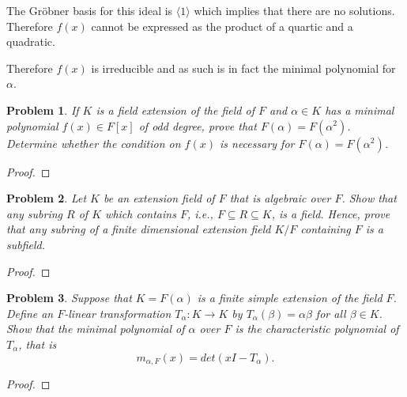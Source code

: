 \documentclass[10pt]{article}
\newcommand{\sk}{\vskip 10mm}
\theoremstyle{plain}
\newtheorem{problem}{Problem}
\theoremstyle{remark}
\begin{document}
The Gr\"obner basis for this ideal is $\langle 1\rangle$ which implies that there are no solutions.
Therefore $f(x)$ cannot be expressed as the product of a quartic and a quadratic.

Therefore $f(x)$ is irreducible and as such is in fact the minimal polynomial for $\alpha$.

\sk

\begin{problem}
  If $K$ is a field extension of the field of $F$ and
  $\alpha \in K$ has a minimal polynomial $f(x) \in F[x]$ of odd degree,
  prove that $F(\alpha) = F(\alpha^2)$. Determine whether the condition
  on $f(x)$ is necessary for $F(\alpha) = F(\alpha^2)$.
\end{problem}

\begin{proof}
  
\end{proof}

\sk

\begin{problem}{6}
  Let $K$ be an extension field of $F$ that is algebraic over $F$.
  Show that any subring $R$ of $K$ which contains $F$, i.e.,
  $F \subseteq R \subseteq K$, is a field. Hence, prove that any subring of
  a finite dimensional extension field $K/F$ containing $F$ is a subfield.
\end{problem}

\begin{proof}
  
\end{proof}

\sk

\begin{problem}{7}
  Suppose that $K = F(\alpha)$ is a finite simple extension of the field $F$.
  Define an $F$-linear transformation
  $T_\alpha: K \to K$ by $T_\alpha (\beta) = \alpha\beta$ for all $\beta \in K$.
  Show that the minimal polynomial of $\alpha$ over $F$ is the characteristic
  polynomial of $T_\alpha$, that is
  \begin{equation*}
    m_{\alpha, F}(x) = det(xI - T_\alpha).
  \end{equation*}
\end{problem}

\begin{proof}
  
\end{proof}

\end{document}
